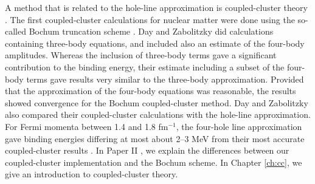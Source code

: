 \documentclass[a4paper,12pt]{report}
\begin{document}
A method that is related to the hole-line approximation 
is coupled-cluster theory \cite{coester1958,coester1960,
  cizek1966,cizek1971,bartlett_review}. The first 
coupled-cluster calculations for nuclear matter were
done using the so-called Bochum truncation scheme 
\cite{kummel1978,day_cc}. Day and Zabolitzky did 
calculations \cite{day_cc} containing three-body equations, 
and included also an estimate of the four-body amplitudes. 
Whereas the inclusion of three-body 
terms gave a significant contribution to the binding
energy, their estimate including a subset of the 
four-body terms gave results very similar to the
three-body approximation. Provided that the  
approximation of the four-body equations was 
reasonable, the results showed convergence for the 
Bochum coupled-cluster method. Day and Zabolitzky 
also compared their coupled-cluster calculations with
the hole-line approximation. For Fermi momenta between
1.4 and 1.8 fm$^{-1}$, the four-hole line approximation 
gave binding energies differing at most about 2--3 MeV 
from their most accurate coupled-cluster results 
\cite{day_cc}. In Paper II \cite{baardsen}, we 
explain the differences between our coupled-cluster
implementation and the Bochum scheme. In Chapter 
\ref{ch:cc}, we give an introduction to coupled-cluster 
theory. 
\end{document}
